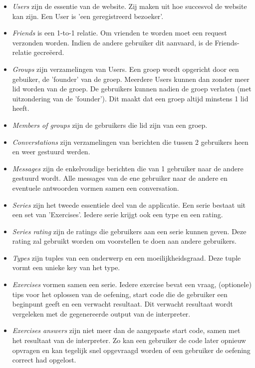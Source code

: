 \begin{itemize}
    \item \emph{Users} zijn de essentie van de website. Zij maken uit hoe succesvol de website kan zijn.
        Een User is 'een geregistreerd bezoeker'.
    \item \emph{Friends} is een 1-to-1 relatie. Om vrienden te worden moet een request verzonden worden.
        Indien de andere gebruiker dit aanvaard, is de Friends-relatie gecre\"{e}erd.
    \item \emph{Groups} zijn verzamelingen van Users. Een groep wordt opgericht door een gebuiker, de 'founder'
        van de groep. Meerdere Users kunnen dan zonder meer lid worden van de groep. De gebruikers kunnen
        nadien de groep verlaten (met uitzondering van de 'founder'). Dit maakt dat een groep altijd minstens
        1 lid heeft.
    \item \emph{Members of groups} zijn de gebruikers die lid zijn van een groep.
    \item \emph{Converstations} zijn verzamelingen van berichten die tussen 2 gebruikers heen en weer gestuurd
        werden.
    \item \emph{Messages} zijn de enkelvoudige berichten die van 1 gebruiker naar de andere gestuurd wordt.
        Alle messages van de ene gebruiker naar de andere en eventuele antwoorden vormen samen een conversation.
    \item \emph{Series} zijn het tweede essentiele deel van de applicatie. Een serie bestaat uit een set
        van 'Exercises'. Iedere serie krijgt ook een type en een rating.
    \item \emph{Series rating} zijn de ratings die gebruikers aan een serie kunnen geven. Deze rating
        zal gebruikt worden om voorstellen te doen aan andere gebruikers.
    \item \emph{Types} zijn tuples van een onderwerp en een moeilijkheidsgraad. Deze tuple vormt een
        unieke key van het type.
    \item \emph{Exercises} vormen samen een serie. Iedere exercise bevat een vraag, (optionele) tips voor
        het oplossen van de oefening, start code die de gebruiker een beginpunt geeft en een verwacht resultaat.
        Dit verwacht resultaat wordt vergeleken met de gegenereerde output van de interpreter.
    \item \emph{Exercises answers} zijn niet meer dan de aangepaste start code, samen met het resultaat
        van de interpreter. Zo kan een gebruiker de code later opnieuw opvragen en kan tegelijk snel
        opgevraagd worden of een gebruiker de oefening correct had opgelost.
\end{itemize}
